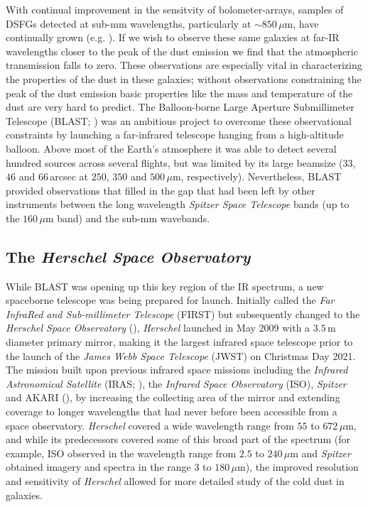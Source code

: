 With continual improvement in the sensitvity of bolometer-arrays, samples of DSFGs detected at sub-mm wavelengths, particularly at $\sim 850\,\mu$m, have continually grown (e.g. \citealt{Borys_2003, Coppin_2006, Weiss_2009, Casey_2013, Geach_2017}). If we wish to observe these same galaxies at far-IR wavelengths closer to the peak of the dust emission we find that the atmospheric transmission falls to zero. These observations are especially vital in characterizing the properties of the dust in these galaxies; without observations constraining the peak of the dust emission basic properties like the mass and temperature of the dust are very hard to predict. The Balloon-borne Large Aperture Submillimeter Telescope (BLAST; \citealt{Devlin_2009}) was an ambitious project to overcome these observational constraints by launching a far-infrared telescope hanging from a high-altitude balloon. Above most of the Earth's atmosphere it was able to detect several hundred sources across several flights, but was limited by its large beamsize ($33$, $46$ and $66\,$arcsec at $250$, $350$ and $500\,\mu$m, respectively). Nevertheless, BLAST provided observations that filled in the gap that had been left by other instruments between the long wavelength \textit{Spitzer Space Telescope} bands (up to the $160\,\mu$m band) and the sub-mm wavebands.

\subsection{The \textit{Herschel Space Observatory}}

While BLAST was opening up this key region of the IR spectrum, a new spaceborne telescope was being prepared for launch. Initially called the \textit{Far InfraRed and Sub-millimeter Telescope} (FIRST) but subsequently changed to the \textit{Herschel Space Observatory} (\citealt{Pilbratt_2010}), \textit{Herschel} launched in May 2009 with a $3.5\,$m diameter primary mirror, making it the largest infrared space telescope prior to the launch of the \textit{James Webb Space Telescope} (JWST) on Christmas Day 2021. The mission built upon previous infrared space missions including the \textit{Infrared Astronomical Satellite} (IRAS; \citealt{Neugebauer_1984}), the \textit{Infrared Space Observatory} (ISO), \textit{Spitzer} and AKARI (\citealt{Murakami_2007}), by increasing the collecting area of the mirror and extending coverage to longer wavelengths that had never before been accessible from a space observatory. \textit{Herschel} covered a wide wavelength range from $55$ to $672\,\mu$m, and while its predecessors covered some of this broad part of the spectrum (for example, ISO observed in the wavelength range from $2.5$ to $240\,\mu$m and \textit{Spitzer} obtained imagery and spectra in the range $3$ to $180\,\mu$m), the improved resolution and sensitivity of \textit{Herschel} allowed for more detailed study of the cold dust in galaxies.

